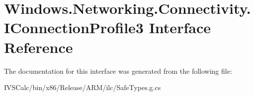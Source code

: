 \hypertarget{interface_windows_1_1_networking_1_1_connectivity_1_1_i_connection_profile3}{}\section{Windows.\+Networking.\+Connectivity.\+I\+Connection\+Profile3 Interface Reference}
\label{interface_windows_1_1_networking_1_1_connectivity_1_1_i_connection_profile3}


The documentation for this interface was generated from the following file\+:\begin{DoxyCompactItemize}
\item 
I\+V\+S\+Calc/bin/x86/\+Release/\+A\+R\+M/ilc/Safe\+Types.\+g.\+cs\end{DoxyCompactItemize}

